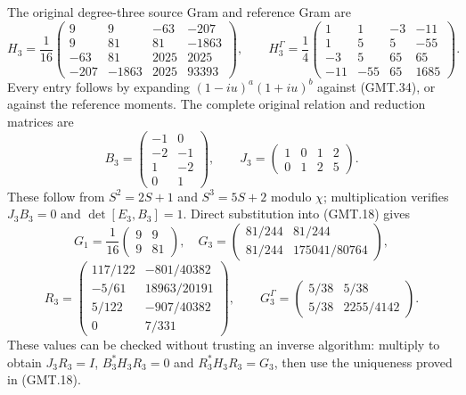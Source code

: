\documentclass[11pt]{article}
\begin{document}
The original degree-three source Gram and reference Gram are
\[
 H_3=\frac1{16}\begin{pmatrix}
 9&9&-63&-207\\9&81&81&-1863\\
 -63&81&2025&2025\\-207&-1863&2025&93393
 \end{pmatrix},\qquad
 H_3^\Gamma=\frac14\begin{pmatrix}
 1&1&-3&-11\\1&5&5&-55\\-3&5&65&65\\-11&-55&65&1685
 \end{pmatrix}.                                               \tag{GMT.35}
\]
Every entry follows by expanding $(1-iu)^a(1+iu)^b$ against
(GMT.34), or against the reference moments. The complete original
relation and reduction matrices are
\[
 B_3=\begin{pmatrix}-1&0\\-2&-1\\1&-2\\0&1\end{pmatrix},
 \qquad J_3=\begin{pmatrix}1&0&1&2\\0&1&2&5\end{pmatrix}.
                                                                    \tag{GMT.36}
\]
These follow from $S^2=2S+1$ and $S^3=5S+2$ modulo $\chi$;
multiplication verifies $J_3B_3=0$ and $\det[E_3,B_3]=1$.
Direct substitution into (GMT.18) gives
\[
 G_1=\frac1{16}\begin{pmatrix}9&9\\9&81\end{pmatrix},\quad
 G_3=\begin{pmatrix}81/244&81/244\\81/244&175041/80764\end{pmatrix},
\]
\[
 R_3=\begin{pmatrix}
 117/122&-801/40382\\-5/61&18963/20191\\
 5/122&-907/40382\\0&7/331
 \end{pmatrix},\qquad
 G_3^\Gamma=\begin{pmatrix}5/38&5/38\\5/38&2255/4142\end{pmatrix}.
                                                                    \tag{GMT.37}
\]
These values can be checked without trusting an inverse algorithm:
multiply to obtain $J_3R_3=I$, $B_3^*H_3R_3=0$ and
$R_3^*H_3R_3=G_3$, then use the uniqueness proved in (GMT.18).
\end{document}
